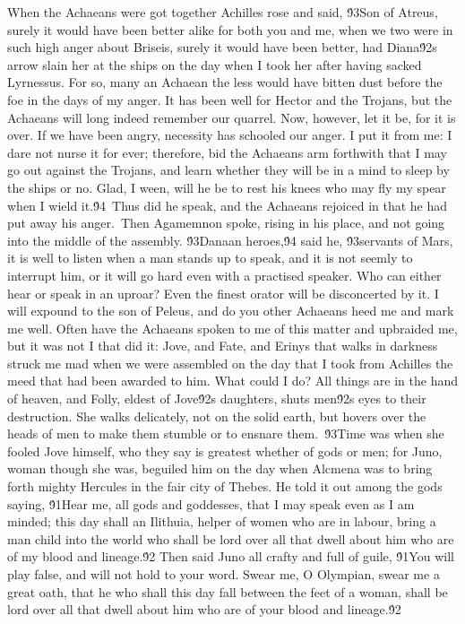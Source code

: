 {When the Achaeans were got together Achilles rose and said, \'93Son of Atreus, surely it would have been better alike for both you and me, when we two were in such high anger about Briseis, surely it would have been better, had Diana\'92s arrow slain her at the ships on the day when I took her after having sacked Lyrnessus. For so, many an Achaean the less would have bitten dust before the foe in the days of my anger. It has been well for Hector and the Trojans, but the Achaeans will long indeed remember our quarrel. Now, however, let it be, for it is over. If we have been angry, necessity has schooled our anger. I put it from me: I dare not nurse it for ever; therefore, bid the Achaeans arm forthwith that I may go out against the Trojans, and learn whether they will be in a mind to sleep by the ships or no. Glad, I ween, will he be to rest his knees who may fly my spear when I wield it.\'94\
Thus did he speak, and the Achaeans rejoiced in that he had put away his anger.\
Then Agamemnon spoke, rising in his place, and not going into the middle of the assembly. \'93Danaan heroes,\'94 said he, \'93servants of Mars, it is well to listen when a man stands up to speak, and it is not seemly to interrupt him, or it will go hard even with a practised speaker. Who can either hear or speak in an uproar? Even the finest orator will be disconcerted by it. I will expound to the son of Peleus, and do you other Achaeans heed me and mark me well. Often have the Achaeans spoken to me of this matter and upbraided me, but it was not I that did it: Jove, and Fate, and Erinys that walks in darkness struck me mad when we were assembled on the day that I took from Achilles the meed that had been awarded to him. What could I do? All things are in the hand of heaven, and Folly, eldest of Jove\'92s daughters, shuts men\'92s eyes to their destruction. She walks delicately, not on the solid earth, but hovers over the heads of men to make them stumble or to ensnare them.\
\'93Time was when she fooled Jove himself, who they say is greatest whether of gods or men; for Juno, woman though she was, beguiled him on the day when Alcmena was to bring forth mighty Hercules in the fair city of Thebes. He told it out among the gods saying, \'91Hear me, all gods and goddesses, that I may speak even as I am minded; this day shall an Ilithuia, helper of women who are in labour, bring a man child into the world who shall be lord over all that dwell about him who are of my blood and lineage.\'92 Then said Juno all crafty and full of guile, \'91You will play false, and will not hold to your word. Swear me, O Olympian, swear me a great oath, that he who shall this day fall between the feet of a woman, shall be lord over all that dwell about him who are of your blood and lineage.\'92\
}
